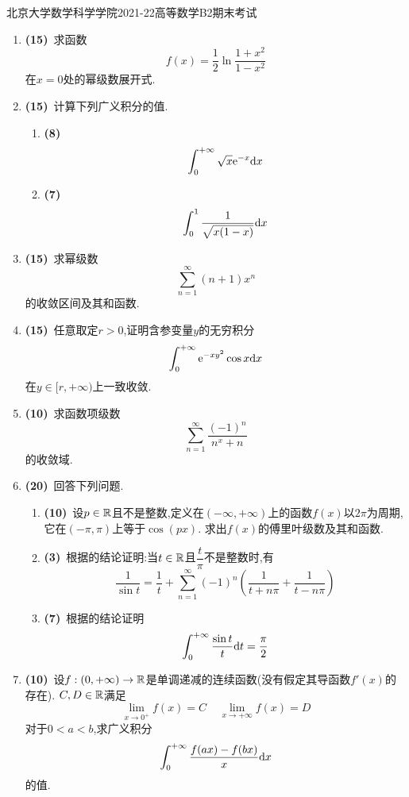 \documentclass{ctexart}
\begin{document}
\pagestyle{empty}
\begin{center}\Large
    北京大学数学科学学院2021-22高等数学B2期末考试
\end{center}
\begin{enumerate}[leftmargin=*,label=\textbf{\arabic*.},topsep=0pt,parsep=0pt,itemsep=0pt,partopsep=0pt]
    \item \textbf{(15)}\ 求函数
        \[f(x)=\dfrac12\ln\dfrac{1+x^2}{1-x^2}\]
        在$x=0$处的幂级数展开式.

    \item \textbf{(15)}\ 计算下列广义积分的值.
        \begin{enumerate}[label=\tbf{(\arabic*)},topsep=0pt,parsep=0pt,itemsep=0pt,partopsep=0pt]
            \item \textbf{(8)}
                \[\int_0^{+\infty}\sqrt{x}\mathrm{e}^{-x}\mathrm{d} x\]
            \item \textbf{(7)}\ 
                \[\int_0^1\dfrac{1}{\sqrt{x(1-x)}}\mathrm{d} x\]
        \end{enumerate}

    \item \textbf{(15)}\ 求幂级数
        \[\sum_{n=1}^{\infty}(n+1)x^n\]
        的收敛区间及其和函数.

    \item \textbf{(15)}\ 任意取定$r>0$,证明含参变量$y$的无穷积分
        \[\int_0^{+\infty}\mathrm{e}^{-xy^2}\cos x\mathrm{d} x\]
        在$y\in[r,+\infty)$上一致收敛.
        
    \item \textbf{(10)}\ 求函数项级数
        \[\sum_{n=1}^\infty\dfrac{(-1)^n}{n^x+n}\]
        的收敛域.

    \item \textbf{(20)}\ 回答下列问题.
        \begin{enumerate}[label=\tbf{(\arabic*)},topsep=0pt,parsep=0pt,itemsep=0pt,partopsep=0pt]
            \item \textbf{(10\songti{分})}\ 设$p\in\mathbb{R}$且不是整数,定义在$(-\infty,+\infty)$上的函数$f(x)$以$2\pi$为周期,它在$(-\pi,\pi)$上等于$\cos(px)$.%
                求出$f(x)$的傅里叶级数及其和函数.
            \item \textbf{(3)}\ 根据的结论证明:当$t\in\mathbb{R}$且$\dfrac{t}{\pi}$不是整数时,有
                \[\dfrac{1}{\sin t}=\dfrac1t+\sum_{n=1}^{\infty}(-1)^n\left(\dfrac{1}{t+n\pi}+\dfrac{1}{t-n\pi}\right)\]
            \item \textbf{(7\songti{分})}\ 根据\tbf{(2)}的结论证明
                \[\int_0^{+\infty}\dfrac{\sin t}{t}\mathrm{d} t=\dfrac\pi2\]

        \end{enumerate}
    \item \textbf{(10)}\ 设$f:(0,+\infty)\to\mathbb{R}$是单调递减的连续函数(没有假定其导函数$f'(x)$的存在).%
        $C,D\in\mathbb{R}$满足
        \[\lim_{x\to0^+}f(x)=C\ \ \ \ \ \lim_{x\to+\infty}f(x)=D\]
        对于$0<a<b$,求广义积分
        \[\int_0^{+\infty}\dfrac{f(ax)-f(bx)}{x}\mathrm{d} x\]
        的值.
\end{enumerate}
\end{document}
